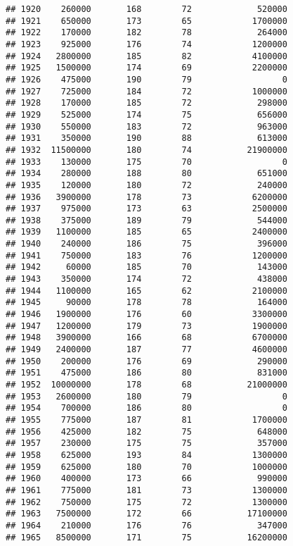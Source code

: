 \documentclass[
]{article}
\begin{document}
\begin{verbatim}
## 1920    260000       168        72             520000
## 1921    650000       173        65            1700000
## 1922    170000       182        78             264000
## 1923    925000       176        74            1200000
## 1924   2800000       185        82            4100000
## 1925   1500000       174        69            2200000
## 1926    475000       190        79                  0
## 1927    725000       184        72            1000000
## 1928    170000       185        72             298000
## 1929    525000       174        75             656000
## 1930    550000       183        72             963000
## 1931    350000       190        88             613000
## 1932  11500000       180        74           21900000
## 1933    130000       175        70                  0
## 1934    280000       188        80             651000
## 1935    120000       180        72             240000
## 1936   3900000       178        73            6200000
## 1937    975000       173        63            2500000
## 1938    375000       189        79             544000
## 1939   1100000       185        65            2400000
## 1940    240000       186        75             396000
## 1941    750000       183        76            1200000
## 1942     60000       185        70             143000
## 1943    350000       174        72             438000
## 1944   1100000       165        62            2100000
## 1945     90000       178        78             164000
## 1946   1900000       176        60            3300000
## 1947   1200000       179        73            1900000
## 1948   3900000       166        68            6700000
## 1949   2400000       187        77            4600000
## 1950    200000       176        69             290000
## 1951    475000       186        80             831000
## 1952  10000000       178        68           21000000
## 1953   2600000       180        79                  0
## 1954    700000       186        80                  0
## 1955    775000       187        81            1700000
## 1956    425000       182        75             648000
## 1957    230000       175        75             357000
## 1958    625000       193        84            1300000
## 1959    625000       180        70            1000000
## 1960    400000       173        66             990000
## 1961    775000       181        73            1300000
## 1962    750000       175        72            1300000
## 1963   7500000       172        66           17100000
## 1964    210000       176        76             347000
## 1965   8500000       171        75           16200000

\end{verbatim}
\end{document}

